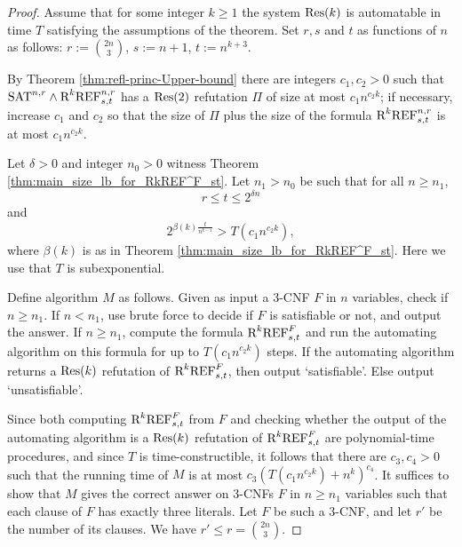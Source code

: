 \documentclass[10pt,a4paper]{article}
\theoremstyle{remark}
\newtheorem*{switching lemma}{Switching Lemma}
\newtheorem*{open problem}{Open Problem}
\theoremstyle{definition}
\begin{document}
\begin{proof}
Assume that for some integer $k \geq 1$ the system $\textnormal{Res}(k)$ is automatable in time $T$ satisfying the assumptions of the theorem. Set $r, s$ and $t$ as functions of $n$ as follows: $r := \binom{2n}{3}$, $s := n+1$, $t := n^{k+3}$. 

By Theorem \ref{thm:refl-princ-Upper-bound} there are integers $c_1, c_2 > 0$ such that $\textnormal{SAT}^{n,r} \land \textnormal{R}^k\textnormal{REF}^{n,r}_{s,t}$ has a $\textnormal{Res}(2)$ refutation $\Pi$ of size at most $c_1 n^{c_2 k}$; if necessary, increase $c_1$ and $c_2$ so that the size of $\Pi$ plus the size of the formula $\textnormal{R}^k\textnormal{REF}^{n,r}_{s,t}$ is at most $c_1 n^{c_2 k}$. 

Let $\delta > 0$ and integer $n_0 > 0$ witness Theorem \ref{thm:main_size_lb_for_RkREF^F_st}.  
Let $n_1 > n_0$ be such that for all $n \geq n_1$,
\begin{equation}
\label{eqn:cond_on_t_in_proof_of_non-automatability}
r \leq t \leq 2^{\delta n} 
\end{equation}
and 
\begin{equation}
\label{eqn:l.b._on_refutations_greater_than_runtime_of_automating}
2^{\beta(k)\frac{t}{n^{k-1}}} > T(c_1 n^{c_2 k}),
\end{equation}
where $\beta(k)$ is as in Theorem \ref{thm:main_size_lb_for_RkREF^F_st}. Here we use that $T$ is subexponential.

Define algorithm $M$ as follows. Given as input a 3-CNF $F$ in $n$ variables, check if $n \geq n_1$. If $n < n_1$, use brute force to decide if $F$ is satisfiable or not, and output the answer. If $n \geq n_1$, compute the formula $\textnormal{R}^k\textnormal{REF}^{F}_{s,t}$ and run the automating algorithm on this formula for up to $T(c_1 n^{c_2 k})$ steps. If the automating algorithm returns a $\textnormal{Res}(k)$ refutation of $\textnormal{R}^k\textnormal{REF}^{F}_{s,t}$, then output `satisfiable'. Else output `unsatisfiable'. 

Since both computing $\textnormal{R}^k\textnormal{REF}^{F}_{s,t}$ from $F$ and checking whether the output of the automating algorithm is a $\textnormal{Res}(k)$ refutation of $\textnormal{R}^k\textnormal{REF}^{F}_{s,t}$ are polynomial-time procedures, and since $T$ is time-constructible, it follows that there are $c_3, c_4 > 0$ such that the running time of $M$ is at most $c_3 (T(c_1 n^{c_2 k}) + n^{k})^{c_4}$. 
It suffices to show that $M$ gives the correct answer on 3-CNFs $F$ in $n \geq n_1$ variables such that each clause of $F$ has exactly three literals. Let $F$ be such a 3-CNF, and let $r'$ be the number of its clauses. We have $r' \leq r = \binom{2n}{3}$.


\end{proof}
\end{document}
